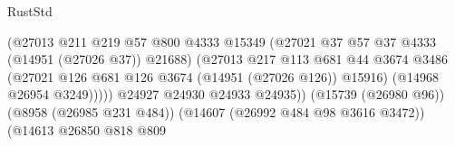 \begin{lexlean}{RustStd}
\begin{coremodule}
                                                        (@27013
                                                          @211
                                                          @219
                                                          @57
                                                          @800
                                                          @4333
                                                          @15349
                                                          (@27021
                                                            @37
                                                            @57
                                                            @37
                                                            @4333
                                                            (@14951 (@27026 @37))
                                                            @21688)
                                                          (@27013
                                                            @217
                                                            @113
                                                            @681
                                                            @44
                                                            @3674
                                                            @3486
                                                            (@27021
                                                              @126
                                                              @681
                                                              @126
                                                              @3674
                                                              (@14951 (@27026 @126))
                                                              @15916)
                                                            (@14968 @26954 @3249)))))
                                                    @24927
                                                    @24930
                                                    @24933
                                                    @24935))
                                                (@15739 (@26980 @96))
                                                (@8958 (@26985 @231 @484))
                                                (@14607 (@26992 @484 @98 @3616 @3472))
                                                (@14613
                                                  @26850
                                                  @818
                                                  @809

\end{coremodule}
\end{lexlean}

